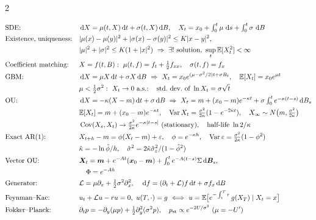 \begin{paracol}{2}
\begin{keyformulas}
\begin{align*}
&\text{SDE:} && \dd X=\mu(t,X)\dd t+\sigma(t,X)\dd B,\quad X_t=x_0+\textstyle\int_0^t\mu\,\dd s+\int_0^t\sigma\,\dd B\\
&\text{Existence, uniqueness:} && |\mu(x)-\mu(y)|^2+|\sigma(x)-\sigma(y)|^2\le K|x-y|^2,\\
& && |\mu|^2+|\sigma|^2\le K(1+|x|^2)\ \Rightarrow\ \exists!\ \text{solution},\ \sup_t\E[X_t^2]<\infty\\
&\text{Coefficient matching:} && X=f(t,B):\ \mu(t,f)=f_t+\tfrac12f_{xx},\quad\sigma(t,f)=f_x\\
&\text{GBM:} && \dd X=\mu X\dd t+\sigma X\dd B\ \Rightarrow\ X_t=x_0e^{(\mu-\sigma^2/2)t+\sigma B_t},\quad\E[X_t]=x_0e^{\mu t}\\
& && \mu<\tfrac12\sigma^2:\ X_t\to0\ \text{a.s.};\quad\text{std.\ dev.\ of }\ln X_t=\sigma\sqrt t\\
&\text{OU:} && \dd X=-\kappa(X-m)\dd t+\sigma\dd B\ \Rightarrow\ X_t=m+(x_0-m)e^{-\kappa t}+\sigma\textstyle\int_0^te^{-\kappa(t-s)}\dd B_s\\
& && \E[X_t]=m+(x_0-m)e^{-\kappa t},\quad\Var X_t=\tfrac{\sigma^2}{2\kappa}(1-e^{-2\kappa t}),\quad X_\infty\sim N\bigl(m,\tfrac{\sigma^2}{2\kappa}\bigr)\\
& && \Cov(X_s,X_t)\to\tfrac{\sigma^2}{2\kappa}e^{-\kappa|t-s|}\ (\text{stationary}),\quad\text{half-life }\ln2/\kappa\\
&\text{Exact AR(1):} && X_{t+h}-m=\phi(X_t-m)+\varepsilon,\quad\phi=e^{-\kappa h},\quad\Var\varepsilon=\tfrac{\sigma^2}{2\kappa}(1-\phi^2)\\
& && \hat\kappa=-\ln\hat\phi/h,\quad\hat\sigma^2=2\hat\kappa\hat\sigma_\varepsilon^2/(1-\hat\phi^2)\\
&\text{Vector OU:} && \bm X_t=\bm m+e^{-At}(\bm x_0-\bm m)+\textstyle\int_0^te^{-A(t-s)}\Sigma\dd\bm B_s,\\
& && \quad\Phi=e^{-Ah}\\
&\text{Generator:} && \mathcal L=\mu\partial_x+\tfrac12\sigma^2\partial_x^2,\quad\dd f=(\partial_t+\mathcal L)f\dd t+\sigma f_x\dd B\\
&\text{Feynman--Kac:} && u_t+\mathcal Lu-ru=0,\ u(T,\cdot)=g\ \Longleftrightarrow\ u=\E\bigl[e^{-\int_t^Tr}\,g(X_T)\mid X_t=x\bigr]\\
&\text{Fokker--Planck:} && \partial_tp=-\partial_y(\mu p)+\tfrac12\partial_y^2(\sigma^2p),\quad p_{\mathrm{st}}\propto e^{-2U/\sigma^2}\ (\mu=-U')\\

\end{align*}
\end{keyformulas}
\end{paracol}
